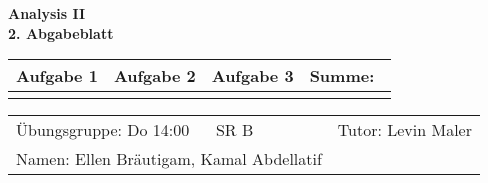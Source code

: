 \documentclass[a4paper, 12pt]{scrartcl}
\begin{document}
\begin{center}
    \textbf{Analysis II\\2. Abgabeblatt}\\[2em]
	\def\arraystretch{2}
    \begin{tabular}{|l|l|l||p{18mm}|}
        \hline
         Aufgabe 1 & Aufgabe 2 & Aufgabe 3 & Summe:~ \\
         \hline &&&\\
         \hline  
    \end{tabular}
\end{center}
\begingroup
\def\arraystretch{1.5}
\begin{tabular}{p{}p{}}
	\hline
    Übungsgruppe: Do 14:00 ~~ SR B& Tutor: Levin Maler \\
    Namen: Ellen Bräutigam, Kamal Abdellatif &\\
    \hline
\end{tabular}
\endgroup
\\
\end{document}
